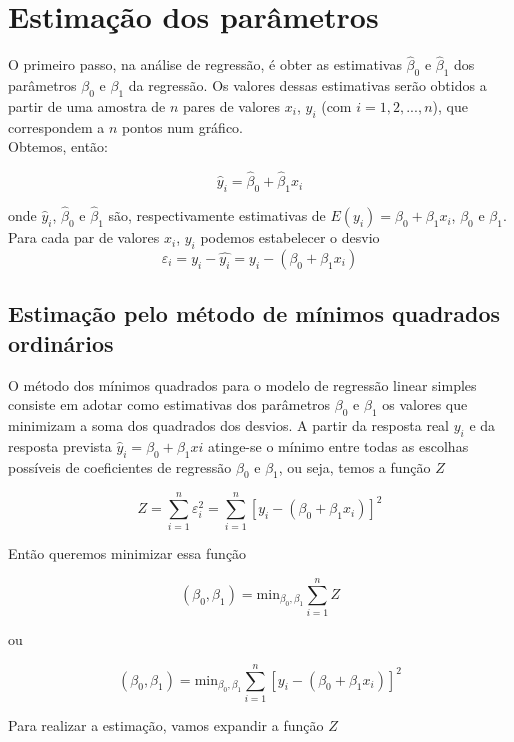 \chapter{Estimação dos parâmetros}
\label{ch:estimacao}

\noindent O primeiro passo, na análise de regressão, é obter as estimativas $\hat{\beta}_0$ e $\hat{\beta}_1$ dos
parâmetros $\beta_0$ e $\beta_1$ da regressão. Os valores dessas estimativas serão obtidos a partir de uma amostra de $n$ pares de valores $x_i$, $y_i$ (com $i = 1, 2, ..., n$), que correspondem a $n$ pontos num gráfico.\\

\noindent Obtemos, então:

$$\hat{y}_i = \hat{\beta}_0 + \hat{\beta}_1 x_i$$

\noindent onde $\hat{y}_i$, $\hat{\beta}_0$ e $\hat{\beta}_1$ são, respectivamente estimativas de $E(y_i) =\beta_0 + \beta_1 x_i$, $\beta_0$ e $\beta_1$. Para cada par de valores $x_i$, $y_i$ podemos estabelecer o desvio $$\varepsilon_i = y_i-\hat{y_i} = y_i-(\beta_0 + \beta_1 x_i)$$

\section{Estimação pelo método de mínimos quadrados ordinários}

\noindent O método dos mínimos quadrados para o modelo de regressão linear simples consiste em adotar como estimativas dos parâmetros $\beta_0$ e $\beta_1$ os valores que minimizam a soma dos quadrados dos desvios.
A partir da resposta real $y_i$ e da resposta prevista $\hat{y}_i = \beta_0 + \beta_1 xi$ atinge-se o mínimo entre todas as escolhas possíveis de coeficientes de regressão $\beta_0$ e $\beta_1$, ou seja, temos a função $Z$

$$Z = \sum_{i=1}^{n}\varepsilon_i^2 = \sum_{i=1}^{n}[y_i -(\beta_0 + \beta_1 x_i)]^2$$

\noindent Então queremos minimizar essa função

$$(\beta_0, \beta_1) = \text{min}_{\beta_0, \beta_1} \sum_{i=1}^{n} Z$$

\noindent ou

\begin{equation}
\label{eq:somaerro}
    (\beta_0, \beta_1) = \text{min}_{\beta_0, \beta_1} \sum_{i=1}^{n} [y_i -(\beta_0 + \beta_1 x_i)]^2
\end{equation}

\noindent Para realizar a estimação, vamos expandir a função $Z$


